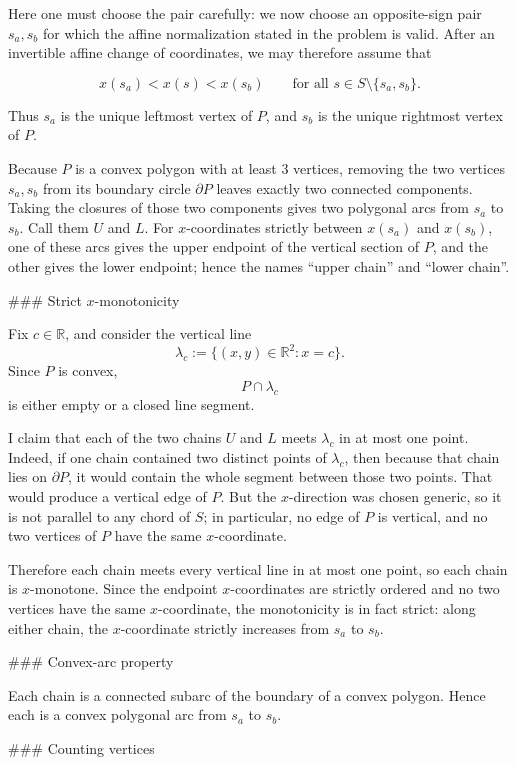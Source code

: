 Here one must choose the pair carefully: we now choose an opposite-sign pair \(s_a,s_b\) for which the affine normalization stated in the problem is valid. After an invertible affine change of coordinates, we may therefore assume that

\[
x(s_a)<x(s)<x(s_b)\qquad\text{for all }s\in S\setminus\{s_a,s_b\}.
\]

Thus \(s_a\) is the unique leftmost vertex of \(P\), and \(s_b\) is the unique rightmost vertex of \(P\).

Because \(P\) is a convex polygon with at least \(3\) vertices, removing the two vertices \(s_a,s_b\) from its boundary circle \(\partial P\) leaves exactly two connected components. Taking the closures of those two components gives two polygonal arcs from \(s_a\) to \(s_b\). Call them \(U\) and \(L\). For \(x\)-coordinates strictly between \(x(s_a)\) and \(x(s_b)\), one of these arcs gives the upper endpoint of the vertical section of \(P\), and the other gives the lower endpoint; hence the names “upper chain” and “lower chain”.

### Strict \(x\)-monotonicity

Fix \(c\in\mathbb{R}\), and consider the vertical line
\[
\lambda_c:=\{(x,y)\in\mathbb{R}^2:x=c\}.
\]
Since \(P\) is convex,
\[
P\cap \lambda_c
\]
is either empty or a closed line segment.

I claim that each of the two chains \(U\) and \(L\) meets \(\lambda_c\) in at most one point. Indeed, if one chain contained two distinct points of \(\lambda_c\), then because that chain lies on \(\partial P\), it would contain the whole segment between those two points. That would produce a vertical edge of \(P\). But the \(x\)-direction was chosen generic, so it is not parallel to any chord of \(S\); in particular, no edge of \(P\) is vertical, and no two vertices of \(P\) have the same \(x\)-coordinate.

Therefore each chain meets every vertical line in at most one point, so each chain is \(x\)-monotone. Since the endpoint \(x\)-coordinates are strictly ordered and no two vertices have the same \(x\)-coordinate, the monotonicity is in fact strict: along either chain, the \(x\)-coordinate strictly increases from \(s_a\) to \(s_b\).

### Convex-arc property

Each chain is a connected subarc of the boundary of a convex polygon. Hence each is a convex polygonal arc from \(s_a\) to \(s_b\).

### Counting vertices

